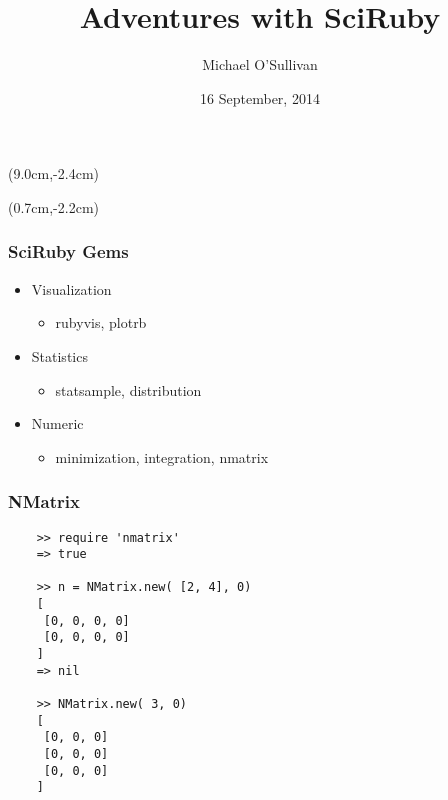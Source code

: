 \documentclass[10pt]{beamer}
\title{Adventures with SciRuby}
\author[MOS]{Michael O'Sullivan}
\date{16 September, 2014}
\begin{document}

\begin{frame}
 \maketitle
\begin{textblock*}{2cm}(9.0cm,-2.4cm)
\end{textblock*}
\begin{textblock*}{2.0cm}(0.7cm,-2.2cm)
\end{textblock*}
\end{frame}


\begin{frame}
  \frametitle{SciRuby Gems}
  \begin{itemize}
      \item Visualization
      \begin{itemize}
        \item rubyvis, plotrb
      \end{itemize}
      \item Statistics
      \begin{itemize}
        \item statsample, distribution
      \end{itemize}
      \item Numeric
      \begin{itemize}
        \item minimization, integration, nmatrix
      \end{itemize}
  \end{itemize}
\end{frame}




\begin{frame}[fragile]
  \frametitle{NMatrix}
  \begin{verbatim}
    >> require 'nmatrix'
    => true

    >> n = NMatrix.new( [2, 4], 0)
    [
     [0, 0, 0, 0]
     [0, 0, 0, 0]
    ]
    => nil

    >> NMatrix.new( 3, 0)
    [
     [0, 0, 0]
     [0, 0, 0]
     [0, 0, 0]
    ]
  \end{verbatim}
\end{frame}
\end{document}
